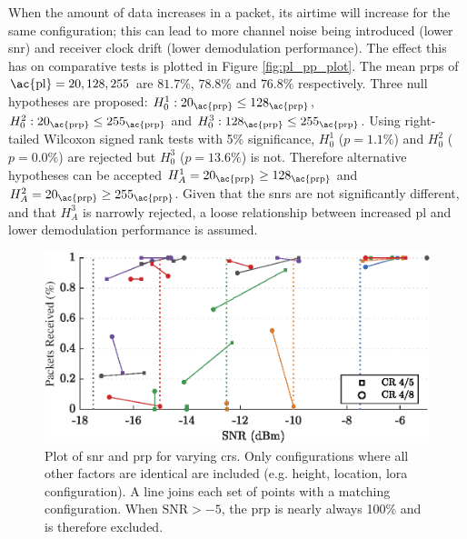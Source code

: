 When the amount of data increases in a packet, its airtime will increase for the same configuration; this can lead to more channel noise being introduced (lower \ac{snr}) and receiver clock drift (lower demodulation performance). The effect this has on comparative tests is plotted in Figure \ref{fig:pl_pp_plot}. The mean \ac{prp}s of $\text{\ac{pl}} = 20, 128, 255$ are $81.7\%$, $78.8\%$ and $76.8\%$ respectively.  Three null hypotheses are proposed: $H^1_{0} : 20_{\text{\ac{prp}}} \leq 128_{\text{\ac{prp}}}$, $H^2_{0} : 20_{\text{\ac{prp}}} \leq 255_{\text{\ac{prp}}}$ and $H^3_{0} : 128_{\text{\ac{prp}}} \leq 255_{\text{\ac{prp}}}$. Using right-tailed Wilcoxon signed rank tests with 5\% significance, $H^1_{0}$ ($p=1.1\%$) and $H^2_{0}$ ($p=0.0\%$) are rejected but $H^3_{0}$ ($p=13.6\%$) is not. Therefore alternative hypotheses can be accepted  $H^1_{A}=20_{\text{\ac{prp}}} \geq 128_{\text{\ac{prp}}}$ and $H^2_{A}=20_{\text{\ac{prp}}} \geq 255_{\text{\ac{prp}}}$. Given that the \ac{snr}s are not significantly different, and that $H^3_{A}$ is narrowly rejected, a loose relationship between increased \ac{pl} and lower demodulation performance is assumed.
\begin{figure}[H]
    \centering
   	\includegraphics{Figures/cr_pp_plot}
    \caption[Effect of Coding Rate on \ac{snr} and \ac{prp}]{
    Plot of \ac{snr} and \ac{prp} for varying \ac{cr}s. Only configurations where all other factors are identical are included (e.g. height, location, \ac{lora} configuration). A line joins each set of points with a matching configuration. When $\text{SNR} > -5$, the \ac{prp} is nearly always 100\% and is therefore excluded.
    }
    \label{fig:cr_pp_plot}
\end{figure}

